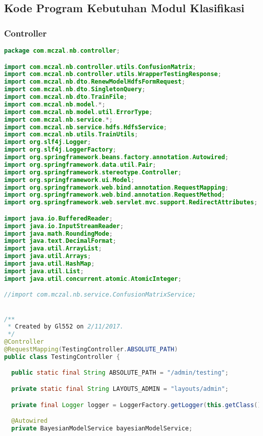 \subsection{Kode Program Kebutuhan Modul Klasifikasi}

\subsubsection{Controller}

\begin{lstlisting}[language=Java,basicstyle=\tiny,caption=TestingController.java]
package com.mczal.nb.controller;

import com.mczal.nb.controller.utils.ConfusionMatrix;
import com.mczal.nb.controller.utils.WrapperTestingResponse;
import com.mczal.nb.dto.RenewModelHdfsFormRequest;
import com.mczal.nb.dto.SingletonQuery;
import com.mczal.nb.dto.TrainFile;
import com.mczal.nb.model.*;
import com.mczal.nb.model.util.ErrorType;
import com.mczal.nb.service.*;
import com.mczal.nb.service.hdfs.HdfsService;
import com.mczal.nb.utils.TrainUtils;
import org.slf4j.Logger;
import org.slf4j.LoggerFactory;
import org.springframework.beans.factory.annotation.Autowired;
import org.springframework.data.util.Pair;
import org.springframework.stereotype.Controller;
import org.springframework.ui.Model;
import org.springframework.web.bind.annotation.RequestMapping;
import org.springframework.web.bind.annotation.RequestMethod;
import org.springframework.web.servlet.mvc.support.RedirectAttributes;

import java.io.BufferedReader;
import java.io.InputStreamReader;
import java.math.RoundingMode;
import java.text.DecimalFormat;
import java.util.ArrayList;
import java.util.Arrays;
import java.util.HashMap;
import java.util.List;
import java.util.concurrent.atomic.AtomicInteger;

//import com.mczal.nb.service.ConfusionMatrixService;


/**
 * Created by Gl552 on 2/11/2017.
 */
@Controller
@RequestMapping(TestingController.ABSOLUTE_PATH)
public class TestingController {

  public static final String ABSOLUTE_PATH = "/admin/testing";

  private static final String LAYOUTS_ADMIN = "layouts/admin";

  private final Logger logger = LoggerFactory.getLogger(this.getClass());

  @Autowired
  private BayesianModelService bayesianModelService;


\end{lstlisting}
